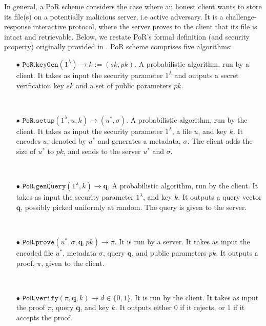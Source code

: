 
In general, a PoR scheme considers the case where an honest client wants to store its file(s) on a  potentially malicious server, i.e active adversary. It is a challenge-response interactive protocol, where the server proves to the client that its file is intact and retrievable. Below, we restate PoR's formal definition (and security property) originally provided in \cite{DBLP:journals/iacr/JuelsK07,DBLP:conf/asiacrypt/ShachamW08}. PoR scheme comprises five algorithms: 

\begin{itemize}
\item[$\bullet$] $\mathtt{PoR.keyGen}(1^{\scriptscriptstyle\lambda})\rightarrow k:=(sk,pk)$.  A probabilistic algorithm, run by a client. It takes as input the security parameter  $1^{\scriptscriptstyle\lambda}$ and outputs a secret verification key $sk$ and a set of public parameters $pk$.

\

\item[$\bullet$] $\mathtt{PoR.setup}(1^{\scriptscriptstyle\lambda}, u,k)\rightarrow (u^{\scriptscriptstyle *}, \sigma)$. A probabilistic algorithm, run by the client. It takes as input the security parameter $1^{\scriptscriptstyle\lambda}$,  a file $u$, and key $k$. It encodes $u$, denoted by $u^{\scriptscriptstyle *}$ and generates  a metadata, $\sigma$. The client adds the size of $u^{\scriptscriptstyle *}$ to $pk$, and sends to the server   $u^{\scriptscriptstyle *}$ and  $\sigma$.

\

\item[$\bullet$] $\mathtt{PoR.genQuery}(1^{\scriptscriptstyle\lambda},k)\rightarrow \bm{q}$. A probabilistic algorithm, run by the client. It takes as input the security parameter  $1^{\scriptscriptstyle\lambda}$, and key $k$. It outputs a  query vector $\bm{q}$, possibly picked uniformly at random. The query is given to the server. 

\

\item[$\bullet$] $\mathtt{PoR.prove}(u^{\scriptscriptstyle *}, \sigma,\bm{q},pk)\rightarrow \pi$. It is run by a server.  It takes as input the encoded file $u^{\scriptscriptstyle *}$, metadata $\sigma$, query $\bm{q}$, and public parameters $pk$. It  outputs a proof, $\pi$, given to the client. 

\

\item[$\bullet$] $\mathtt{PoR.verify}(\pi,\bm{q},k)\rightarrow d\in\{0,1\}$. It is run by the client. It takes as input the proof $\pi$,  query $\bm{q}$, and key $k$. It outputs either $0$ if it rejects,  or $1$ if it accepts the proof. 

\end{itemize}



